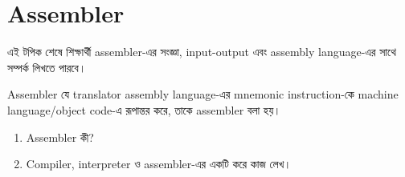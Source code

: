 \section{Assembler}

\begin{learningbox}
এই টপিক শেষে শিক্ষার্থী assembler-এর সংজ্ঞা, input-output এবং assembly language-এর সাথে সম্পর্ক লিখতে পারবে।
\end{learningbox}

\begin{definitionbox}{Assembler}
যে translator assembly language-এর mnemonic instruction-কে machine language/object code-এ রূপান্তর করে, তাকে assembler বলা হয়।
\end{definitionbox}

\begin{center}
\end{center}

\begin{practicebox}
\begin{enumerate}
\item Assembler কী?
\item Compiler, interpreter ও assembler-এর একটি করে কাজ লেখ।
\end{enumerate}
\end{practicebox}
